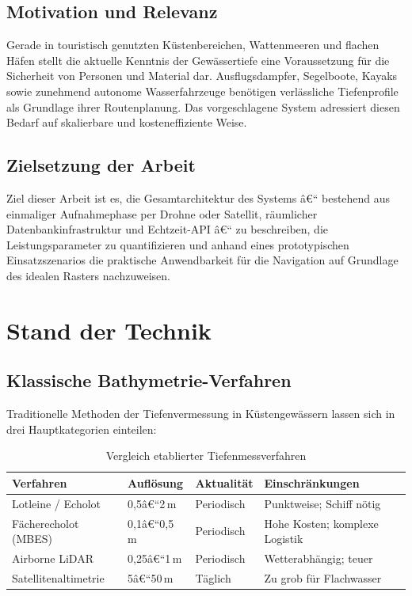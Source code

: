 ﻿\documentclass[a4paper,12pt]{article}
\theoremstyle{definition}
\begin{document}
\subsection{Motivation und Relevanz}

Gerade in touristisch genutzten Küstenbereichen, Wattenmeeren und flachen Häfen stellt
die aktuelle Kenntnis der Gewässertiefe eine Voraussetzung für die Sicherheit von Personen
und Material dar. Ausflugsdampfer, Segelboote, Kayaks sowie zunehmend autonome
Wasserfahrzeuge benötigen verlässliche Tiefenprofile als Grundlage ihrer
Routenplanung. Das vorgeschlagene System adressiert diesen Bedarf auf skalierbare und
kosteneffiziente Weise.

\subsection{Zielsetzung der Arbeit}

Ziel dieser Arbeit ist es, die Gesamtarchitektur des Systems â€“ bestehend aus einmaliger
Aufnahmephase per Drohne oder Satellit, räumlicher Datenbankinfrastruktur und
Echtzeit-API â€“ zu beschreiben, die Leistungsparameter zu quantifizieren und anhand eines
prototypischen Einsatzszenarios die praktische Anwendbarkeit für die Navigation auf
Grundlage des idealen Rasters nachzuweisen.

\section{Stand der Technik}

\subsection{Klassische Bathymetrie-Verfahren}

Traditionelle Methoden der Tiefenvermessung in Küstengewässern lassen sich in drei
Hauptkategorien einteilen:

\begin{table}[H]
\centering
\caption{Vergleich etablierter Tiefenmessverfahren}
\label{tab:verfahren}
\renewcommand{\arraystretch}{1.3}
\begin{tabular}{@{}p{3.5cm}p{3cm}p{3.5cm}p{3.5cm}@{}}
\toprule
\textbf{Verfahren} & \textbf{Auflösung} & \textbf{Aktualität} & \textbf{Einschränkungen} \\
\midrule
Lotleine / Echolot & 0{,}5â€“2\,m & Periodisch & Punktweise; Schiff nötig \\
Fächerecholot (MBES) & 0{,}1â€“0{,}5\,m & Periodisch & Hohe Kosten; komplexe Logistik \\
Airborne LiDAR & 0{,}25â€“1\,m & Periodisch & Wetterabhängig; teuer \\
Satellitenaltimetrie & 5â€“50\,m & Täglich & Zu grob für Flachwasser \\
\bottomrule
\end{tabular}
\end{table}
\end{document}
